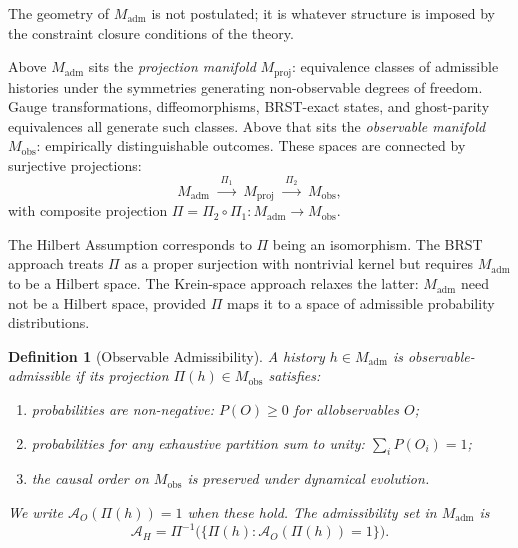 \documentclass[12pt,a4paper]{article}
\newtheorem{definition}[theorem]{Definition}
\theoremstyle{remark}
\begin{document}
The geometry of $M_{\mathrm{adm}}$ is not postulated; it is whatever
structure is imposed by the constraint closure conditions of the theory.

Above $M_{\mathrm{adm}}$ sits the \emph{projection manifold}
$M_{\mathrm{proj}}$: equivalence classes of admissible histories under
the symmetries generating non-observable degrees of freedom. Gauge
transformations, diffeomorphisms, BRST-exact states, and ghost-parity
equivalences all generate such classes. Above that sits the
\emph{observable manifold} $M_{\mathrm{obs}}$: empirically
distinguishable outcomes. These spaces are connected by surjective
projections:
\begin{equation}
  M_{\mathrm{adm}}
  \;\xrightarrow{\;\Pi_1\;}\;
  M_{\mathrm{proj}}
  \;\xrightarrow{\;\Pi_2\;}\;
  M_{\mathrm{obs}},
\end{equation}
with composite projection $\Pi = \Pi_2 \circ \Pi_1 : M_{\mathrm{adm}} \to M_{\mathrm{obs}}$.

The Hilbert Assumption corresponds to $\Pi$ being an isomorphism. The BRST
approach treats $\Pi$ as a proper surjection with nontrivial kernel but
requires $M_{\mathrm{adm}}$ to be a Hilbert space. The Krein-space approach
relaxes the latter: $M_{\mathrm{adm}}$ need not be a Hilbert space, provided
$\Pi$ maps it to a space of admissible probability distributions.

\begin{definition}[Observable Admissibility]
 A history $h \in M_{\mathrm{adm}}$ is \emph{observable-admissible}
if its projection $\Pi(h) \in M_{\mathrm{obs}}$ satisfies:
\begin{enumerate}[label=(\roman*)]
  \item probabilities are non-negative: $P(O) \geq 0$ for all\newline\hspace*{2em}observables $O$;
  \item probabilities for any exhaustive partition sum to unity:
        $\sum_i P(O_i) = 1$;
  \item the causal order on $M_{\mathrm{obs}}$ is preserved under dynamical
        evolution.
\end{enumerate}
We write $\mathcal{A}_O(\Pi(h)) = 1$ when these hold. The admissibility
set in $M_{\mathrm{adm}}$ is
\begin{equation}
  \mathcal{A}_H = \Pi^{-1}\!\bigl(\{\Pi(h) : \mathcal{A}_O(\Pi(h))=1\}\bigr).
\end{equation}
\end{definition}
\end{document}
